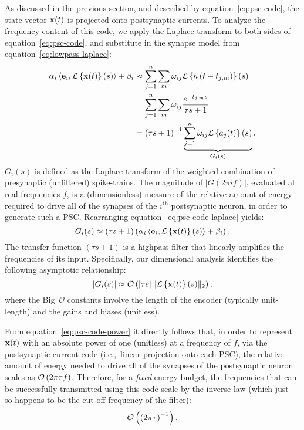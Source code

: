 As discussed in the previous section, and described by equation~\ref{eq:psc-code}, the state-vector $\mathbf{x}(t)$ is projected onto postsynaptic currents.
To analyze the frequency content of this code, we apply the Laplace transform to both sides of equation~\ref{eq:psc-code}, and substitute in the synapse model from equation~\ref{eq:lowpass-laplace}:
\begin{equation} \label{eq:psc-code-laplace}
\begin{aligned}
\alpha_i \left\langle \mathbf{e}_i\text{,}\, \mathcal{L}\left\{{ \mathbf{x}(t) }\right\}(s) \right\rangle + \beta_i &\approx \sum_{j=1}^n \sum_m \omega_{ij} \mathcal{L}\left\{{ h \left( t - t_{j\text{,}m} \right) }\right\}(s) \\
&= \sum_{j=1}^n \sum_m \omega_{ij} \frac{e^{-{t_{j\text{,}m}s}}}{\tau s + 1} \\ 
&= \left( \tau s + 1 \right)^{-1} \underbrace{ \sum_{j=1}^n \omega_{ij} \mathcal{L}\left\{{ a_j(t) }\right\}(s) }_{G_i(s)} \text{.}
\end{aligned}
\end{equation}
$G_i(s)$ is defined as the Laplace transform of the weighted combination of presynaptic (unfiltered) spike-trains.
The magnitude of $| G(2\pi i f) |$, evaluated at real frequencies $f$, is a (dimensionless) measure of the relative amount of energy required to drive all of the synapses of the $i^\text{th}$ postsynaptic neuron, in order to generate such a PSC.
Rearranging equation~\ref{eq:psc-code-laplace} yields:
\begin{equation} \label{eq:psc-code-rearranged}
G_i(s) \approx \left( \tau s + 1 \right) \left( \alpha_i \left\langle \mathbf{e}_i\text{,}\, \mathcal{L}\left\{{ \mathbf{x}(t) }\right\}(s) \right\rangle + \beta_i \right) \text{.}
\end{equation}
The transfer function $\left( \tau s + 1 \right)$ is a highpass filter that linearly amplifies the frequencies of its input.
Specifically, our dimensional analysis identifies the following asymptotic relationship:
\begin{equation} \label{eq:psc-code-power}
| G_i(s) | \approx \mathcal{O}\left({ \left| \tau s \right| \| \mathcal{L}\left\{{ \mathbf{x}(t) }\right\}(s) \|_2 }\right) \text{,}
\end{equation}
where the Big~$\mathcal{O}$ constants involve the length of the encoder (typically unit-length) and the gains and biases (unitless).

From equation~\ref{eq:psc-code-power} it directly follows that, in order to represent $\mathbf{x}(t)$ with an absolute power of one (unitless) at a frequency of $f$, via the postsynaptic current code (i.e.,~linear projection onto each PSC), the relative amount of energy needed to drive all of the synapses of the postsynaptic neuron scales as $\mathcal{O}\left({2 \pi \tau f }\right)$.
Therefore, for a \emph{fixed} energy budget, the frequencies that can be successfully transmitted using this code scale by the inverse law (which just-so-happens to be the cut-off frequency of the filter):
\begin{equation} \label{eq:low-frequency-representation}
\mathcal{O}\left({\left( 2 \pi \tau \right)^{-1}}\right) \text{.}
\end{equation}


